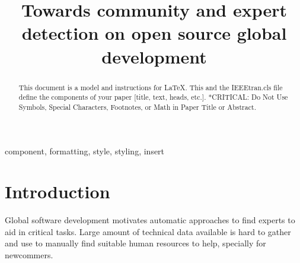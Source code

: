 \documentclass[conference]{IEEEtran}
\begin{document}
\title{Towards community and expert detection on open source global development}

\author{
\and
{}
\and
{}
\and
{}
}

\maketitle

\begin{abstract}
This document is a model and instructions for \LaTeX.
This and the IEEEtran.cls file define the components of your paper [title, text, heads, etc.]. *CRITICAL: Do Not Use Symbols, Special Characters, Footnotes,
or Math in Paper Title or Abstract.
\end{abstract}

\begin{IEEEkeywords}
component, formatting, style, styling, insert
\end{IEEEkeywords}

\section{Introduction}
Global software development motivates automatic approaches to find experts to aid in critical tasks. Large amount of technical data available is hard to gather and use to manually find suitable human resources to help, specially for newcommers.
\end{document}

